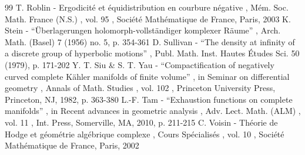 \documentclass[11pt]{article}
\theoremstyle{definition}
\begin{document}
\begin{thebibliography}{99}
 T. Roblin - Ergodicité et équidistribution en courbure négative , Mém. Soc. Math. France (N.S.) , vol. 95 , Société Mathématique de France, Paris, 2003
 K. Stein - “Überlagerungen holomorph-vollständiger komplexer Räume” , Arch. Math. (Basel) 7 (1956) no. 5, p. 354-361
 D. Sullivan - “The density at infinity of a discrete group of hyperbolic motions” , Publ. Math. Inst. Hautes Études Sci. 50 (1979), p. 171-202
 Y. T. Siu \& S. T. Yau - “Compactification of negatively curved complete Kähler manifolds of finite volume” , in Seminar on differential geometry , Annals of Math. Studies , vol. 102 , Princeton University Press, Princeton, NJ, 1982, p. 363-380
 L.-F. Tam - “Exhaustion functions on complete manifolds” , in Recent advances in geometric analysis , Adv. Lect. Math. (ALM) , vol. 11 , Int. Press, Somerville, MA, 2010, p. 211-215
 C. Voisin - Théorie de Hodge et géométrie algébrique complexe , Cours Spécialisés , vol. 10 , Société Mathématique de France, Paris, 2002
\end{thebibliography}
\end{document}
